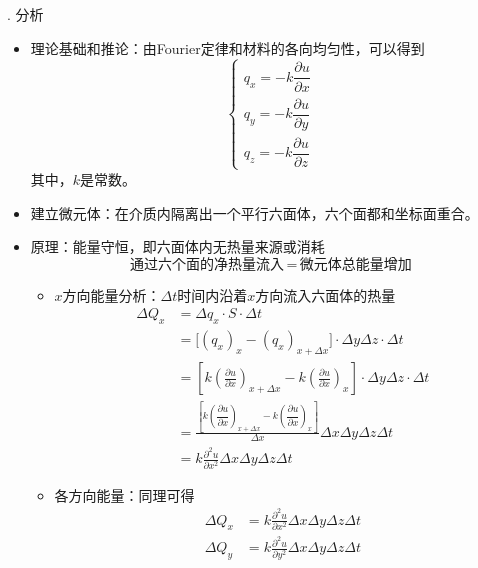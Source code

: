 . 分析
\begin{itemize}
	\item 理论基础和推论：由Fourier定律和材料的各向均匀性，可以得到
	\begin{equation}
		\begin{cases}
			q_x = - k\dfrac{\partial u}{\partial x}\\[1em]
			q_y = - k\dfrac{\partial u}{\partial y}\\[1em]
			q_z = - k\dfrac{\partial u}{\partial z}
		\end{cases}
	\end{equation}
	其中，$k$是常数。
	\item 建立微元体：在介质内隔离出一个平行六面体，六个面都和坐标面重合。
	\item 原理：能量守恒，即六面体内无热量来源或消耗
	\begin{equation}
		\mbox{通过六个面的净热量流入} \, = \, \mbox{微元体总能量增加}
	\end{equation}
	\begin{itemize}
		\item $x$方向能量分析：$\Delta t$时间内沿着$x$方向流入六面体的热量
		\begin{equation*}
			\begin{split}
				\Delta Q_x &= \Delta q_x \cdot S \cdot \Delta t\\
				& = \big[(q_x)_x - (q_x)_{x + \Delta x}\big] \cdot \Delta y \Delta z \cdot \Delta t\\[0.5em]
				& = \left[k \left(\frac{\partial u}{\partial x}\right)_{x+\Delta x} - k \left(\frac{\partial u}{\partial x}\right)_{x} \right]\cdot \Delta y \Delta z \cdot \Delta t\\[1em]
				& = \frac{\left[k \left(\dfrac{\partial u}{\partial x}\right)_{x+\Delta x} - k \left(\dfrac{\partial u}{\partial x}\right)_{x} \right]}{\Delta x} \Delta x \Delta y \Delta z \Delta t\\[0.5em]
				& = k \frac{\partial^2 u}{\partial x^2}\Delta x \Delta y \Delta z \Delta t
			\end{split}
		\end{equation*}
		\item 各方向能量：同理可得
		\begin{equation}
			\begin{split}
				\Delta Q_x &= k \frac{\partial^2 u}{\partial x^2}\Delta x \Delta y \Delta z \Delta t\\[0.5 em]
				\Delta Q_y &= k \frac{\partial^2 u}{\partial y^2}\Delta x \Delta y \Delta z \Delta t\\[0.5em]

\end{split}
\end{equation}
\end{itemize}
\end{itemize}
